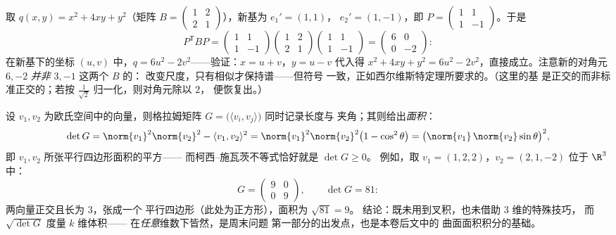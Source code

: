 \begin{example}[合同的作用]\label{ex:b2:quadratic:congruence}
取 $q(x, y) = x^2 + 4xy + y^2$（矩阵 $B = \begin{pmatrix} 1
& 2\\ 2 & 1\end{pmatrix}$），新基为 $e_1' = (1, 1)$，
$e_2' = (1, -1)$，即 $P = \begin{pmatrix} 1 & 1\\ 1 &
-1\end{pmatrix}$。于是
\[
P^{\mathsf T}BP
= \begin{pmatrix} 1 & 1\\ 1 & -1\end{pmatrix}
\begin{pmatrix} 1 & 2\\ 2 & 1\end{pmatrix}
\begin{pmatrix} 1 & 1\\ 1 & -1\end{pmatrix}
= \begin{pmatrix} 6 & 0\\ 0 & -2\end{pmatrix} :
\]
在新基下的坐标 $(u, v)$ 中，$q = 6u^2 -
2v^2$——验证：$x = u + v$，$y = u - v$ 代入得 $x^2 + 4xy +
y^2 = 6u^2 - 2v^2$，直接成立。注意新的对角元 $6,
-2$ \emph{并非} $3, -1$ 这两个 $B$ 的：
改变尺度，只有相似才保持谱——但符号
一致，正如西尔维斯特定理所要求的。（这里的基
是正交的而非标准正交的；若按
$\frac{1}{\sqrt2}$ 归一化，则对角元除以 $2$，
便恢复出。）
\end{example}

\begin{example}[格拉姆行列式度量面积]\label{ex:b2:quadratic:gramarea}
设 $v_1, v_2$ 为欧氏空间中的向量，则格拉姆矩阵 $G =
\bigl(\langle v_i, v_j\rangle\bigr)$ 同时记录长度与
夹角；其则给出\emph{面积}：
\[
\det G = \norm{v_1}^2\norm{v_2}^2 - \langle v_1, v_2\rangle^2
= \norm{v_1}^2\norm{v_2}^2\bigl(1 - \cos^2\theta\bigr)
= \bigl(\norm{v_1}\,\norm{v_2}\sin\theta\bigr)^2 ,
\]
即 $v_1, v_2$ 所张平行四边形面积的平方——
而柯西–施瓦茨不等式恰好就是 $\det G \geq 0$。
例如，取 $v_1 = (1, 2, 2)$，$v_2 = (2, 1, -2)$ 位于
$\R^3$ 中：
\[
G = \begin{pmatrix} 9 & 0\\ 0 & 9 \end{pmatrix},
\qquad
\det G = 81 :
\]
两向量正交且长为 $3$，张成一个
平行四边形（此处为正方形），面积为 $\sqrt{81} = 9$。
结论：既未用到叉积，也未借助 $3$ 维的特殊技巧，
而 $\sqrt{\det G}$ 度量 $k$ 维体积——
在\emph{任意}维数下皆然，是周末问题
第一部分的出发点，也是本卷后文中的
曲面面积积分的基础。
\end{example}

